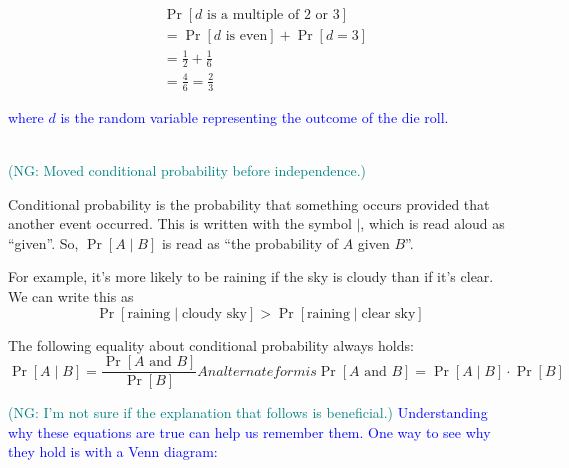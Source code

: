 \documentclass[12 pt]{article}
\newcommand{\nsm}[1]{\textcolor{teal}{(NG: #1)}}
\newcommand{\new}[1]{\textcolor{blue}{#1}}
\newcounter{example}[section]
\begin{document}
\begin{align*}
    &\Pr[d \text{ is a multiple of 2 or 3}] \\
    &= \Pr[d \text{ is even}] + \Pr[d=3]\\
    &= \frac{1}{2} + \frac{1}{6}\\
    &= \frac{4}{6} = \frac{2}{3}
\end{align*}

\new{where $d$ is the random variable representing the outcome of the die roll.}

\hfill\\
\nsm{Moved conditional probability before independence.}

Conditional probability is the probability that something occurs 
provided that another event occurred. This is written with the symbol 
$\mid$, which is read aloud as ``given''. So, $\Pr[A \mid B]$ is 
read as ``the probability of $A$ given $B$''.

For example, it's more likely to be raining if the sky is cloudy 
than if it's clear. We can write this as
\[
    \Pr[\text{raining} \mid \text{cloudy sky}] >
    \Pr[\text{raining} \mid \text{clear sky}]
\]

The following equality about conditional probability always holds:
\begin{subequations}\label{eq:conditional}
    \begin{equation}
        \Pr[A \mid B] = \frac{\Pr[A \text{ and } B]}{\Pr[B]}
        \label{eqn:conditional_mid}
    \end{equation}
An alternate form is
    \begin{equation}
        \Pr[A \text{ and } B] = \Pr[A \mid B] \cdot \Pr[B]
        \label{eqn:conditional_and}
    \end{equation}
\end{subequations}

\nsm{I'm not sure if the explanation that follows is beneficial.}
\new{Understanding why these equations are true can help us remember them.
One way to see why they hold is with a Venn diagram:}

\begin{center}
\end{center}
\end{document}
